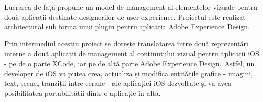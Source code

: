 
\par Lucrarea de față propune un model de management al elementelor vizuale pentru două aplicații destinate designerilor de user experience. Proiectul  este realizat architectural sub forma unui plugin pentru aplicația Adobe Experience Design. 
\par Prin intermediul acestui proiect se dorește translatarea între două reprezentări interne a două aplicații de management al conținutului vizual pentru aplicații iOS - pe de o parte XCode, iar pe de altă parte Adobe Experience Design. Astfel, un developer de iOS va putea crea, actualiza și modifica entitățile grafice - imagini, text, scene, tranziții între ecrane - ale aplicației iOS dezvoltate și va avea posibilitatea portabilității dintr-o aplicație în alta.


